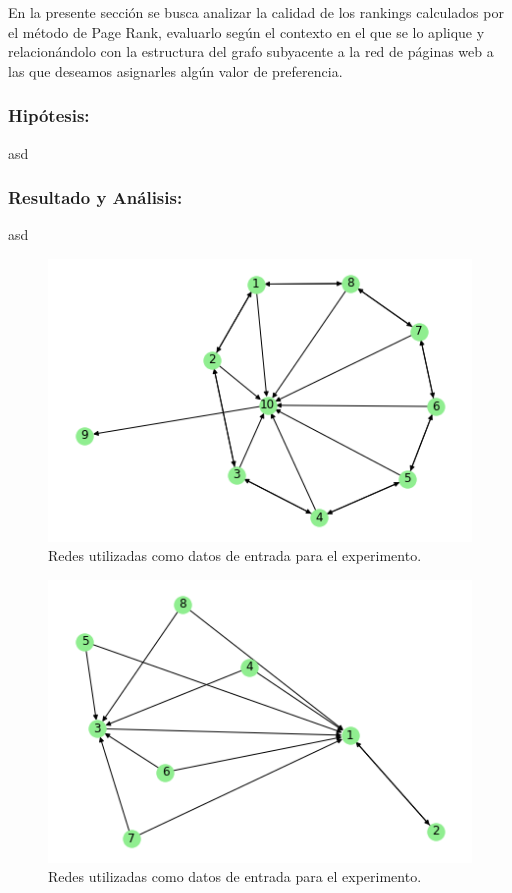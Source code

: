 En la presente sección se busca analizar la calidad de los rankings calculados por el método de Page Rank, evaluarlo según el contexto en el que se lo aplique y relacionándolo con la estructura del grafo subyacente a la red de páginas web a las que deseamos asignarles algún valor de preferencia.

\subsubsection{Hipótesis:}

asd

\subsubsection{Resultado y Análisis: }

asd

\begin{figure}[h]
   \begin{center}
     \includegraphics{img/prueba-circular.png} 
  \end{center}
\caption{Redes utilizadas como datos de entrada para el experimento.} \label{fig:exp3-webs}
\end{figure}

\begin{figure}[h]
   \begin{center}
     \includegraphics{img/prueba_grafo_2.png} 
  \end{center}
\caption{Redes utilizadas como datos de entrada para el experimento.} \label{fig:exp3-webs}
\end{figure}


